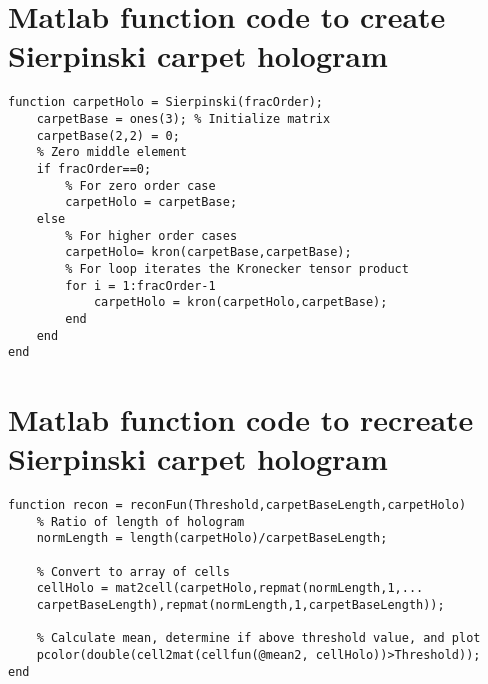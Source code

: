 
\section{Matlab function code to create Sierpinski carpet hologram}
\lstset{language = Matlab}
\begin{lstlisting}
function carpetHolo = Sierpinski(fracOrder);
	carpetBase = ones(3); % Initialize matrix
	carpetBase(2,2) = 0;
	% Zero middle element
	if fracOrder==0;
		% For zero order case
		carpetHolo = carpetBase;
	else
		% For higher order cases
		carpetHolo= kron(carpetBase,carpetBase);
		% For loop iterates the Kronecker tensor product
		for i = 1:fracOrder-1
			carpetHolo = kron(carpetHolo,carpetBase);
		end
	end
end
\end{lstlisting}

\section{Matlab function code to recreate Sierpinski carpet hologram}

\begin{lstlisting}
function recon = reconFun(Threshold,carpetBaseLength,carpetHolo)
	% Ratio of length of hologram
	normLength = length(carpetHolo)/carpetBaseLength; 
	
	% Convert to array of cells
	cellHolo = mat2cell(carpetHolo,repmat(normLength,1,...
	carpetBaseLength),repmat(normLength,1,carpetBaseLength));
	
	% Calculate mean, determine if above threshold value, and plot
	pcolor(double(cell2mat(cellfun(@mean2, cellHolo))>Threshold));
end
\end{lstlisting}


